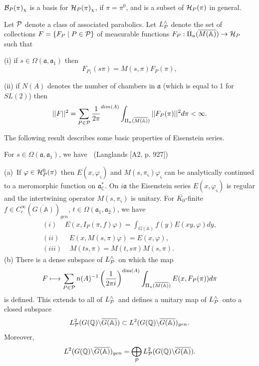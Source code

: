 ${\cal B}_P(\pi)_\chi$ is a basis for
${\cal H}_P(\pi)_\chi$, if $\pi=\pi^0$, and is a subset of
${\cal H}_P(\pi)$ in general.

Let ${\cal P}$ denote a class of associated parabolics. Let
$L_{{\cal P}}^{\wedge }$ denote the
set of collections $F=\{F_P\;|\;P\in {\cal P}\}$ of
measurable functions
$F_P:\Pi _u(\overline{M({\mathbb{A}})})\rightarrow {\cal H}_P$ such
that

(i) if $s\in \Omega ({\mathfrak{a}},{\mathfrak{a}}_1)$ then 
\[
F_{P_1}(s\pi )=M(s,\pi )F_P(\pi ),
\]

(ii) if $N(A)$ denotes the number of chambers in ${\mathfrak{a}}$
(which is equal to 1 for $SL(2)$) then 
\[
||F||^2=\sum_{P\in {\cal{P}}}{1\over 2\pi }^{dim(A)}
\int_{\Pi _u(\overline{M({\mathbb{A}})})}
||F_P(\pi )||^2d\pi <\infty .
\]

The following result describes some basic properties of Eisenstein series.

\begin{theorem} For
$s\in \Omega ({\mathfrak{a}},{\mathfrak{a}}_1)$, we have
{\bf \ }(Langlands [A2, p. 927])

(a)\ If $\varphi \in {\cal H}_P^0(\pi )$\ then
$E(x,\varphi _\varsigma )$ and
$M(s,\pi _\varsigma )\varphi _\varsigma $
can be analytically continued
to a meromorphic function on ${\mathfrak{a}}_{{\mathbb C}}^{*}$. On 
$i{\mathfrak{a}}$ the
Eisenstein series $E(x,\varphi_\varsigma )$
is regular and the intertwining operator $M(s,\pi_\varsigma )$
is unitary. For $\overline{K_0}$-finite
$f\in C_c^\infty (\overline{G({\mathbb{A}})})_{gen}$,
$t\in \Omega ({\mathfrak{a}}_1,{\mathfrak{a}}_2)$, we have 
\[
\begin{array}{c}
(i)\;\;\;\;E(x,I_P(\pi ,f)\varphi )
=\int_{\overline{G({\mathbb{A}})}}f(y)E(xy,\varphi )dy,
\\ 
(ii)\;\;\;\;\;E(x,M(s,\pi )\varphi )=E(x,\varphi ), \\ 
(iii)\;\;\;\;M(ts,\pi )=M(t,s\pi )M(s,\pi ).
\end{array}
\]
(b) There is a dense subspace of $L_{{\cal P}}^{\wedge }$\ on which the map 
\[
F\longmapsto \sum_{P\in {\cal P}}n(A)^{-1}
\left( \frac 1{2\pi i}\right)^{\dim (A)}
\int_{\Pi _u(\overline{M({\mathbb{A}})})}E(x,F_P(\pi ))d\pi 
\]
is defined. This extends to all of $L_{{\cal P}}^{\wedge }$\ and defines a
unitary map of $L_{{\cal P}}^{\wedge }$\ onto a closed subspace 
\[
L_{{\cal P}}^2(G({{\mathbb{Q}}})\backslash \overline{G({\mathbb{A}})})
\subset L^2(G({\mathbb{Q}})\backslash \overline{G({\mathbb{A}})})_{gen}.
\]
Moreover, 
\[
L^2(G({\mathbb{Q}})\backslash \overline{G({\mathbb{A}})})_{gen}
=\bigoplus_{\cal{P}}
L_{\cal{P}}^2(G({\mathbb{Q}})\backslash \overline{G({\mathbb{A}})}).
\]
\end{theorem}


